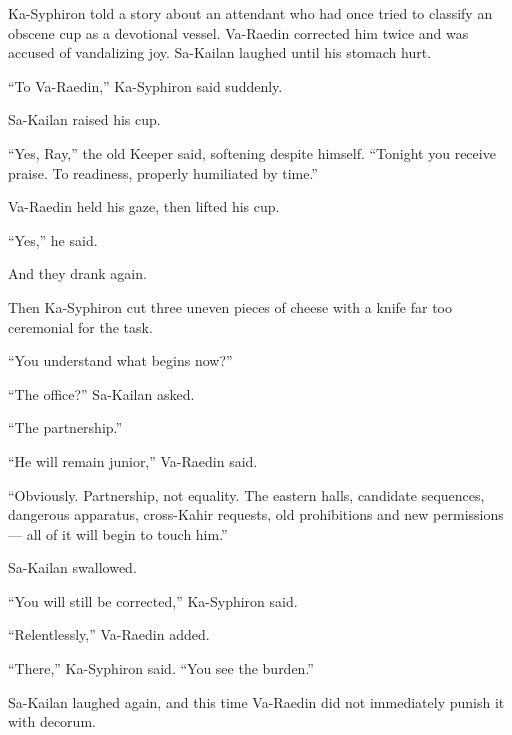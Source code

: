 Ka-Syphiron told a story about an attendant who had once tried to classify an obscene cup as a devotional vessel.
Va-Raedin corrected him twice and was accused of vandalizing joy.
Sa-Kailan laughed until his stomach hurt.\par

“To Va-Raedin,” Ka-Syphiron said suddenly.\par

Sa-Kailan raised his cup.\par

“Yes, Ray,” the old Keeper said, softening despite himself.
“Tonight you receive praise.
To readiness, properly humiliated by time.”\par

Va-Raedin held his gaze, then lifted his cup.\par

“Yes,” he said.\par

And they drank again.\par

Then Ka-Syphiron cut three uneven pieces of cheese with a knife far too ceremonial for the task.\par

“You understand what begins now?”\par

“The office?” Sa-Kailan asked.\par

“The partnership.”\par

“He will remain junior,” Va-Raedin said.\par

“Obviously.
Partnership, not equality.
The eastern halls, candidate sequences, dangerous apparatus, cross-Kahir requests, old prohibitions and new permissions — all of it will begin to touch him.”\par

Sa-Kailan swallowed.\par

“You will still be corrected,” Ka-Syphiron said.\par

“Relentlessly,” Va-Raedin added.\par

“There,” Ka-Syphiron said.
“You see the burden.”\par

Sa-Kailan laughed again, and this time Va-Raedin did not immediately punish it with decorum.\par


